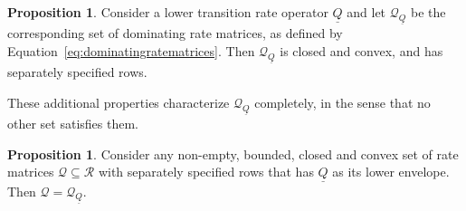\documentclass[10pt]{paper}
\theoremstyle{definition}
\newtheorem{proposition}[theorem]{Proposition}
\newcommand{\rateset}{\mathcal{Q}}
\newcommand{\lrate}{\underline{Q}}
\begin{document}
\begin{proposition}\label{prop:dominatingproperties}
Consider a lower transition rate operator $\lrate$ and let $\rateset_{\lrate}$ be the corresponding set of dominating rate matrices, as defined by Equation~\eqref{eq:dominatingratematrices}. Then $\rateset_{\lrate}$ is closed and convex, and has separately specified rows.
\end{proposition}

\noindent
These additional properties characterize $\rateset_{\lrate}$ completely, in the sense that no other set satisfies them.

\begin{proposition}\label{prop:dominating_unique_characterization}
Consider any non-empty, bounded, closed and convex set of rate matrices $\rateset\subseteq\mathcal{R}$ with separately specified rows that has $\lrate$ as its lower envelope. Then $\rateset=\rateset_{\lrate}$.
\end{proposition}
\end{document}
